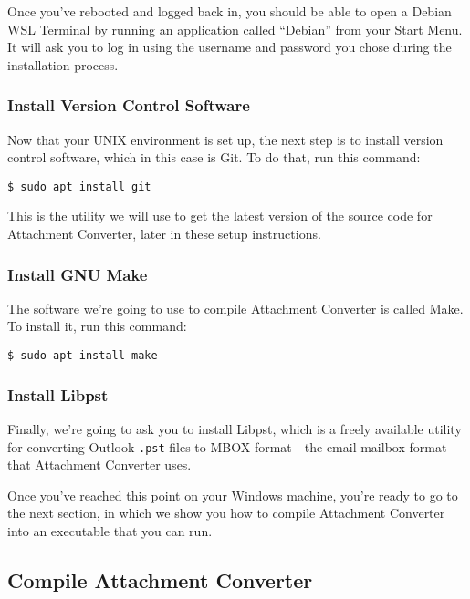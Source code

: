 \documentclass[11pt]{article}
\begin{document}
Once you've rebooted and logged back in, you should be able to open a
Debian WSL Terminal by running an application called ``Debian'' from
your Start Menu.  It will ask you to log in using the username and
password you chose during the installation process.

\subsubsection*{Install Version Control Software}
\label{sec:orgee825ba}

Now that your UNIX environment is set up, the next step is to install
version control software, which in this case is Git.  To do that, run
this command:

\begin{verbatim}
$ sudo apt install git
\end{verbatim}

This is the utility we will use to get the latest version of the
source code for Attachment Converter, later in these setup
instructions.

\subsubsection*{Install GNU Make}
\label{sec:org26e02a3}

The software we're going to use to compile Attachment Converter is
called Make.  To install it, run this command:

\begin{verbatim}
$ sudo apt install make
\end{verbatim}

\subsubsection*{Install Libpst}
\label{sec:orgbd24815}

Finally, we're going to ask you to install Libpst, which is a freely
available utility for converting Outlook \texttt{.pst} files to MBOX
format---the email mailbox format that Attachment Converter uses.

Once you've reached this point on your Windows machine, you're ready
to go to the next section, in which we show you how to compile
Attachment Converter into an executable that you can run.

\subsection*{Compile Attachment Converter \label{orgb563d22}}
\label{sec:org7b89cf4}
\end{document}
